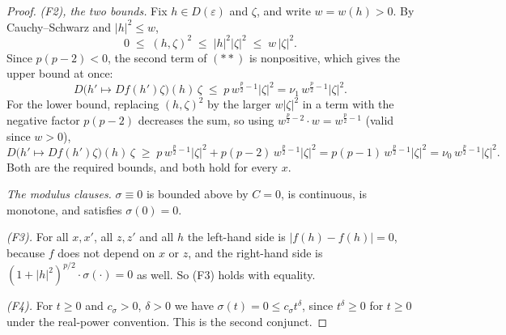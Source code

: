 \begin{proof}
\emph{(F2), the two bounds.}  Fix $h\in D(\varepsilon)$ and $\zeta$, and write
$w=w(h)>0$.  By Cauchy--Schwarz and $|h|^2\le w$,
\[
0\;\le\;(h,\zeta)^2\;\le\;|h|^2|\zeta|^2\;\le\;w\,|\zeta|^2 .
\]
Since $p(p-2)<0$, the second term of $(\ast\ast)$ is nonpositive, which gives
the upper bound at once:
\[
D\bigl(h'\mapsto Df(h')\zeta\bigr)(h)\,\zeta\;\le\;p\,w^{\frac p2-1}|\zeta|^2
=\nu_1\,w^{\frac p2-1}|\zeta|^2 .
\]
For the lower bound, replacing $(h,\zeta)^2$ by the larger $w|\zeta|^2$ in a
term with the negative factor $p(p-2)$ decreases the sum, so using
$w^{\frac p2-2}\cdot w=w^{\frac p2-1}$ (valid since $w>0$),
\[
D\bigl(h'\mapsto Df(h')\zeta\bigr)(h)\,\zeta
\;\ge\;p\,w^{\frac p2-1}|\zeta|^2+p(p-2)\,w^{\frac p2-1}|\zeta|^2
=p(p-1)\,w^{\frac p2-1}|\zeta|^2=\nu_0\,w^{\frac p2-1}|\zeta|^2 .
\]
Both are the required bounds, and both hold for every $x$.

\emph{The modulus clauses.}  $\sigma\equiv0$ is bounded above by $C=0$, is
continuous, is monotone, and satisfies $\sigma(0)=0$.

\emph{(F3).}  For all $x,x'$, all $z,z'$ and all $h$ the left-hand side is
$|f(h)-f(h)|=0$, because $f$ does not depend on $x$ or $z$, and the right-hand
side is $(1+|h|^2)^{p/2}\cdot\sigma(\cdot)=0$ as well.  So (F3) holds with
equality.

\emph{(F4).}  For $t\ge0$ and $c_\sigma>0$, $\delta>0$ we have
$\sigma(t)=0\le c_\sigma t^\delta$, since $t^\delta\ge0$ for $t\ge0$ under the
real-power convention.  This is the second conjunct.
\end{proof}
